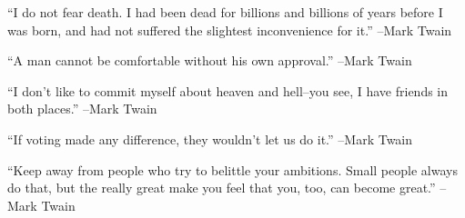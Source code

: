 \documentclass{article}%
\begin{document}
\linebreak%
\vspace{1mm}%
\begin{minipage}{\textwidth}%
\flushleft%
“I do not fear death. I had been dead for billions and billions of years before I was born, and had not suffered the slightest inconvenience for it.”%
\linebreak%
\vspace{1mm}%
–Mark Twain%
\linebreak%
\vspace{1mm}%
\end{minipage}%
\linebreak%
\vspace{1mm}%
\begin{minipage}{\textwidth}%
\flushleft%
“A man cannot be comfortable without his own approval.”%
\linebreak%
\vspace{1mm}%
–Mark Twain%
\linebreak%
\vspace{1mm}%
\end{minipage}%
\linebreak%
\vspace{1mm}%
\begin{minipage}{\textwidth}%
\flushleft%
“I don't like to commit myself about heaven and hell–you see, I have friends in both places.”%
\linebreak%
\vspace{1mm}%
–Mark Twain%
\linebreak%
\vspace{1mm}%
\end{minipage}%
\linebreak%
\vspace{1mm}%
\begin{minipage}{\textwidth}%
\flushleft%
“If voting made any difference, they wouldn't let us do it.”%
\linebreak%
\vspace{1mm}%
–Mark Twain%
\linebreak%
\vspace{1mm}%
\end{minipage}%
\linebreak%
\vspace{1mm}%
\begin{minipage}{\textwidth}%
\flushleft%
“Keep away from people who try to belittle your ambitions. Small people always do that, but the really great make you feel that you, too, can become great.”%
\linebreak%
\vspace{1mm}%
–Mark Twain%
\linebreak%
\vspace{1mm}%
\end{minipage}%
\end{document}
